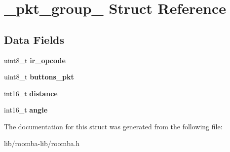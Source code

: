 \hypertarget{struct__pkt__group__2}{}\section{\+\_\+pkt\+\_\+group\+\_ Struct Reference}
\label{struct__pkt__group__2}
\subsection*{Data Fields}
\begin{DoxyCompactItemize}
\item 
\hypertarget{group__roomba-lib_ga7494ef600683ac83238b92858a4e94b3}{}uint8\+\_\+t {\bfseries ir\+\_\+opcode}\label{group__roomba-lib_ga7494ef600683ac83238b92858a4e94b3}

\item 
\hypertarget{group__roomba-lib_ga2e2e9f09a86e88f3b7f65e2f6b5b5e89}{}uint8\+\_\+t {\bfseries buttons\+\_\+pkt}\label{group__roomba-lib_ga2e2e9f09a86e88f3b7f65e2f6b5b5e89}

\item 
\hypertarget{group__roomba-lib_ga072d8646d6d10af62984a86f56f1daac}{}int16\+\_\+t {\bfseries distance}\label{group__roomba-lib_ga072d8646d6d10af62984a86f56f1daac}

\item 
\hypertarget{group__roomba-lib_ga42c6ce09c2a6d93ce385e0e2e6226db3}{}int16\+\_\+t {\bfseries angle}\label{group__roomba-lib_ga42c6ce09c2a6d93ce385e0e2e6226db3}

\end{DoxyCompactItemize}


The documentation for this struct was generated from the following file\+:\begin{DoxyCompactItemize}
\item 
lib/roomba-\/lib/roomba.\+h\end{DoxyCompactItemize}
